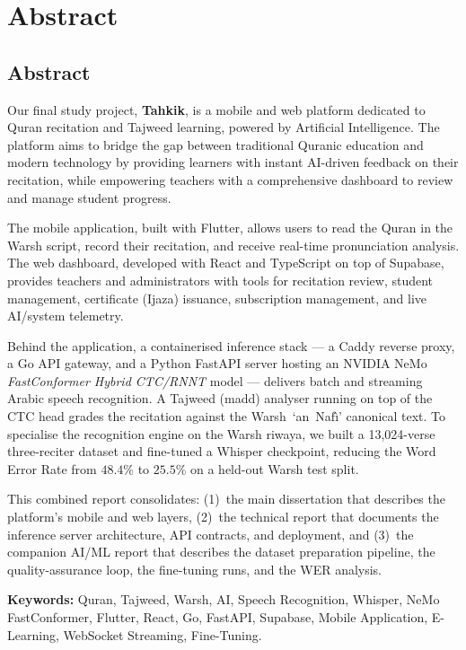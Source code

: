 \chapter*{Abstract}

\section*{Abstract}
Our final study project, \textbf{Tahkik}, is a mobile and web platform
dedicated to Quran recitation and Tajweed learning, powered by Artificial
Intelligence. The platform aims to bridge the gap between traditional
Quranic education and modern technology by providing learners with instant
AI-driven feedback on their recitation, while empowering teachers with a
comprehensive dashboard to review and manage student progress.

The mobile application, built with Flutter, allows users to read the Quran
in the Warsh script, record their recitation, and receive real-time
pronunciation analysis. The web dashboard, developed with React and
TypeScript on top of Supabase, provides teachers and administrators with
tools for recitation review, student management, certificate (Ijaza)
issuance, subscription management, and live AI/system telemetry.

Behind the application, a containerised inference stack --- a Caddy
reverse proxy, a Go API gateway, and a Python FastAPI server hosting an
NVIDIA NeMo \textit{FastConformer Hybrid CTC/RNNT} model --- delivers
batch and streaming Arabic speech recognition. A Tajweed (madd) analyser
running on top of the CTC head grades the recitation against the
Warsh~`an~Naf{\^\i}' canonical text. To specialise the recognition engine
on the Warsh riwaya, we built a 13{,}024-verse three-reciter dataset
and fine-tuned a Whisper checkpoint, reducing the Word Error Rate from
$48.4\%$ to $25.5\%$ on a held-out Warsh test split.

This combined report consolidates: (1)~the main dissertation that
describes the platform's mobile and web layers, (2)~the technical report
that documents the inference server architecture, API contracts, and
deployment, and (3)~the companion AI/ML report that describes the dataset
preparation pipeline, the quality-assurance loop, the fine-tuning runs,
and the WER analysis.

\textbf{Keywords:} Quran, Tajweed, Warsh, AI, Speech Recognition, Whisper,
NeMo FastConformer, Flutter, React, Go, FastAPI, Supabase, Mobile
Application, E-Learning, WebSocket Streaming, Fine-Tuning.

